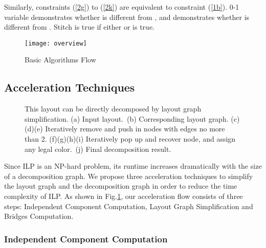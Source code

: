 \documentclass[10pt,conference]{IEEEtran}
\begin{document}
Similarly, constraints (\ref{2g}) to (\ref{2k}) are equivalent to constraint (\ref{1b}). 0-1 variable  demonstrates whether  is different from , and  demonstrates whether  is different from .
Stitch  is true if either  or  is true.


\begin{figure}[tb]
	\centering
	\texttt{[image: overview]}
	\caption{Basic Algorithms Flow}
	\label{fig:overview}
\end{figure}

\subsection{Acceleration Techniques}

\begin{figure*}[t]
	\centering
	\hspace{.1em}
	\caption{This layout can be directly decomposed by layout graph simplification.
	(a) Input layout.~(b) Corresponding layout graph.
	(c)(d)(e) Iteratively remove and push in nodes with edges no more than 2.
	(f)(g)(h)(i) Iteratively pop up and recover node, and assign any legal color.~(j) Final decomposition result.
}
	\label{fig:Simplify}
\end{figure*}

Since ILP is an NP-hard problem, its runtime increases dramatically with the size of a decomposition graph.
We propose three acceleration techniques to simplify the layout graph and the decomposition graph in order to reduce the time complexity of ILP.
As shown in Fig.\ref{fig:overview}, our acceleration flow consists of three steps: Independent Component Computation, Layout Graph Simplification and Bridges Computation.

\subsubsection{Independent Component Computation}
\end{document}
